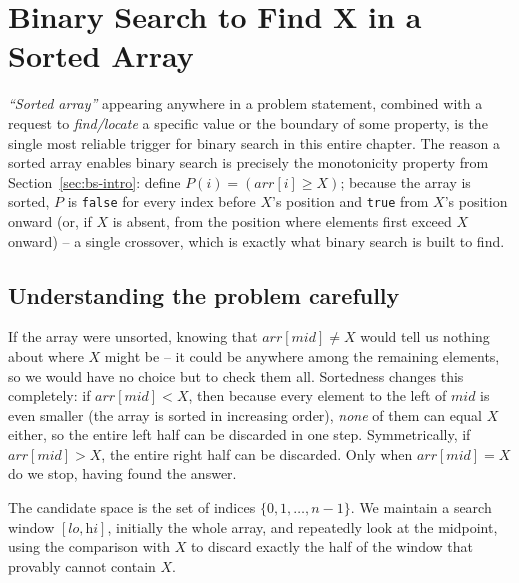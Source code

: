 \section{Binary Search to Find X in a Sorted Array}
\label{sec:bs-find-x}


\begin{patternbox}
\emph{``Sorted array''} appearing anywhere in a problem statement,
combined with a request to \emph{find/locate} a specific value or the
boundary of some property, is the single most reliable trigger for binary
search in this entire chapter. The reason a sorted array enables binary
search is precisely the monotonicity property from
Section~\ref{sec:bs-intro}: define $P(i) = (\textit{arr}[i] \ge X)$; because
the array is sorted, $P$ is \texttt{false} for every index before $X$'s
position and \texttt{true} from $X$'s position onward (or, if $X$ is
absent, from the position where elements first exceed $X$ onward) -- a
single crossover, which is exactly what binary search is built to find.
\end{patternbox}

\subsection*{Understanding the problem carefully}

If the array were unsorted, knowing that $\textit{arr}[\textit{mid}] \ne X$
would tell us nothing about where $X$ might be -- it could be anywhere
among the remaining elements, so we would have no choice but to check them
all. Sortedness changes this completely: if
$\textit{arr}[\textit{mid}] < X$, then because every element to the left of
$\textit{mid}$ is even smaller (the array is sorted in increasing order),
\emph{none} of them can equal $X$ either, so the entire left half can be
discarded in one step. Symmetrically, if $\textit{arr}[\textit{mid}] > X$,
the entire right half can be discarded. Only when
$\textit{arr}[\textit{mid}] = X$ do we stop, having found the answer.

\begin{ideabox}
The candidate space is the set of indices $\{0, 1, \dots, n-1\}$. We
maintain a search window $[\textit{lo}, \textit{hi}]$, initially the whole
array, and repeatedly look at the midpoint, using the comparison with $X$ to
discard exactly the half of the window that provably cannot contain $X$.
\end{ideabox}

